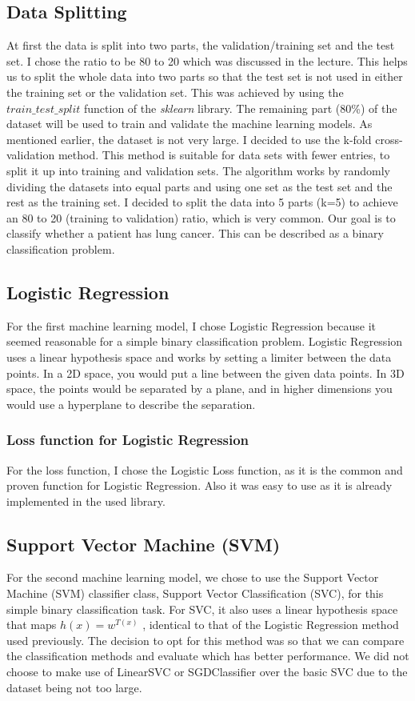 \documentclass[a4paper,12pt]{article}
\begin{document}
\subsection{Data Splitting}
\label{sec:org264af56}
At first the data is split into two parts, the validation/training set and the test set. I chose the ratio to be 80 to 20 which was discussed in the lecture.
This helps us to split the whole data into two parts so that the test set is not used in either the training set or the validation set.
This was achieved by using the \(train\_test\_split\) function of the \emph{sklearn} library.
The remaining part (80\%) of the dataset will be used to train and validate the machine learning models.
As mentioned earlier, the dataset is not very large.
I decided to use the k-fold cross-validation method.
This method is suitable for data sets with fewer entries, to split it up into training and validation sets.
The algorithm works by randomly dividing the datasets into equal parts and using one set as the test set and the rest as the training set.
I decided to split the data into 5 parts (k=5) to achieve an 80 to 20 (training to validation) ratio, which is very common.
Our goal is to classify whether a patient has lung cancer. This can be described as a binary classification problem.

\subsection{Logistic Regression}
\label{sec:org5c49c76}
For the first machine learning model, I chose Logistic Regression because it seemed reasonable for a simple binary classification problem.
Logistic Regression uses a linear hypothesis space and works by setting a limiter between the data points.
In a 2D space, you would put a line between the given data points. In 3D space, the points would be separated by a plane, and in higher dimensions you would use a hyperplane to describe the separation.

\subsubsection{Loss function for Logistic Regression}
\label{sec:org635ab4a}
For the loss function, I chose the Logistic Loss function, as it is the common and proven function for Logistic Regression. Also it was easy to use as it is already implemented in the used library.

\subsection{Support Vector Machine (SVM)}
\label{sec:orgc341288}
For the second machine learning model, we chose to use the Support Vector Machine (SVM) classifier class, Support Vector Classification (SVC), for this simple binary classification task. For SVC, it also uses a linear hypothesis space that maps \(h(x) = w^{T(x)}\) , identical to that of the Logistic Regression method used previously. The decision to opt for this method was so that we can compare the classification methods and evaluate which has better performance. We did not choose to make use of LinearSVC or SGDClassifier over the basic SVC due to the dataset being not too large.
\end{document}
